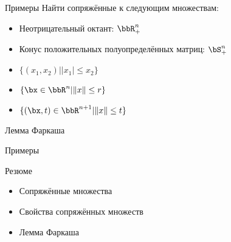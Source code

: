 \documentclass[12pt,russian]{beamer}
\begin{document}
\begin{frame}{Примеры}
Найти сопряжённые к следующим множествам:
\begin{itemize}
\item Неотрицательный октант: $\bbR^n_+$
\item Конус положительных полуопределённых матриц: $\bS^n_+$
\item $\{ (x_1, x_2) | |x_1| \leq x_2 \}$
\item $\{ \bx \in \bbR^n | \| x \| \leq r \}$
\item $\{ (\bx, t) \in \bbR^{n+1} | \| x \| \leq t \}$
\end{itemize}
\end{frame}

\begin{frame}{Лемма Фаркаша}
\begin{lemma}[Фаркаш]

\end{lemma}
\end{frame}

\begin{frame}{Примеры}

\end{frame}

\begin{frame}{Резюме}
\begin{itemize}
\item Сопряжённые множества
\item Свойства сопряжённых множеств
\item Лемма Фаркаша
\end{itemize}

\end{frame}
\end{document}
